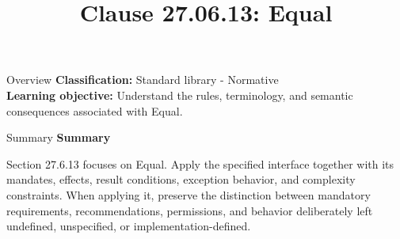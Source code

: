 \documentclass[10pt,letterpaper]{article}
\title{Clause 27.06.13: Equal}
\author{}
\date{}
\begin{document}
\maketitle
\begin{CornellOverviewBox}{Overview}
\textbf{Classification:} Standard library - Normative\\[2pt]
\textbf{Learning objective:} Understand the rules, terminology, and semantic consequences associated with Equal.
\end{CornellOverviewBox}\begin{CornellSummaryBox}{Summary}
{\sffamily\bfseries\color{Accent} Summary}\par\vspace{3pt}Section 27.6.13 focuses on Equal. Apply the specified interface together with its mandates, effects, result conditions, exception behavior, and complexity constraints. When applying it, preserve the distinction between mandatory requirements, recommendations, permissions, and behavior deliberately left undefined, unspecified, or implementation-defined.
\end{CornellSummaryBox}
\end{document}
